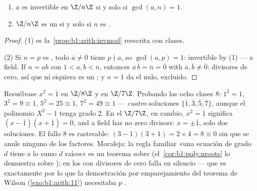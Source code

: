 \begin{theorem}\label{thm:b1:structures:zp}
\begin{enumerate}
  \item $\overline a$ es invertible en $\Z/n\Z$ si y solo si
        $\gcd(a, n) = 1$.
  \item $\Z/n\Z$ es un  si y solo si $n$ es .
\end{enumerate}
\end{theorem}

\begin{proof}
(1) es la~\cref{prop:b1:arith:invmod} reescrita con clases.

(2) Si $n = p$ es , todo $\overline a \neq \overline 0$ tiene $p
\nmid a$, so $\gcd(a, p) = 1$: invertible by (1) --- a field. If $n =
ab$ con $1 < a, b < n$, entonces $\overline a\, \overline b = \overline
n = \overline 0$ with $\overline a, \overline b \neq \overline 0$:
divisores de cero, así que ni siquiera es un ; y
$n = 1$ da el  nulo, excluido.
\end{proof}

\begin{example}\label{ex:b1:structures:sqrtone}
Resuélvase $x^2 = \overline 1$ en $\Z/8\Z$ y en $\Z/7\Z$. Probando las
ocho clases  $8$: $1^2 = 1$, $3^2 = 9 \equiv 1$, $5^2 = 25
\equiv 1$, $7^2 = 49 \equiv 1$ --- \emph{cuatro} soluciones
$\{\overline1, \overline3, \overline5, \overline7\}$, aunque el
polinomio $X^2 - 1$ tenga grado $2$. En el  $\Z/7\Z$, en
cambio, $x^2 = \overline1$ significa $(x - \overline1)(x +
\overline1) = \overline0$, and a field has no zero divisors: $x =
\pm\overline1$, solo dos soluciones. El fallo  $8$ es
rastreable: $(3-1)(3+1) = 2 \times 4 = 8 \equiv 0$ sin que se anule
ninguno de los factores. Moraleja: la regla familiar «una ecuación de
grado $d$ tiene a lo sumo $d$ raíces» es un teorema sobre
\emph{} (el~\cref{cor:b1:poly:nroots} lo demuestra
sobre ); en los  con divisores de cero falla en
silencio --- que es exactamente por lo que la demostración por
emparejamiento del teorema de Wilson (\cref{exo:b1:arith:11}) necesitaba
$p$ .
\end{example}

